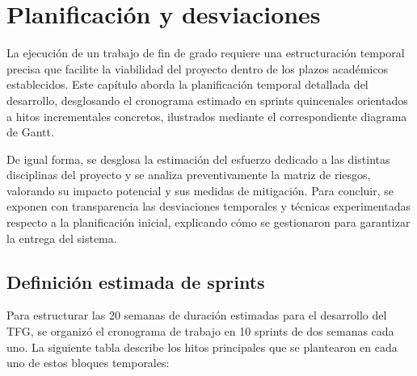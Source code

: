 \documentclass[12pt,a4paper,oneside]{report}
\begin{document}
\chapter{Planificación y desviaciones}

La ejecución de un trabajo de fin de grado requiere una estructuración temporal precisa que facilite la viabilidad del proyecto dentro de los plazos académicos establecidos. Este capítulo aborda la planificación temporal detallada del desarrollo, desglosando el cronograma estimado en sprints quincenales orientados a hitos incrementales concretos, ilustrados mediante el correspondiente diagrama de Gantt.

De igual forma, se desglosa la estimación del esfuerzo dedicado a las distintas disciplinas del proyecto y se analiza preventivamente la matriz de riesgos, valorando su impacto potencial y sus medidas de mitigación. Para concluir, se exponen con transparencia las desviaciones temporales y técnicas experimentadas respecto a la planificación inicial, explicando cómo se gestionaron para garantizar la entrega del sistema.

\section{Definición estimada de sprints}

Para estructurar las 20 semanas de duración estimadas para el desarrollo del TFG, se organizó el cronograma de trabajo en 10 sprints de dos semanas cada uno. La siguiente tabla describe los hitos principales que se plantearon en cada uno de estos bloques temporales:
\end{document}
